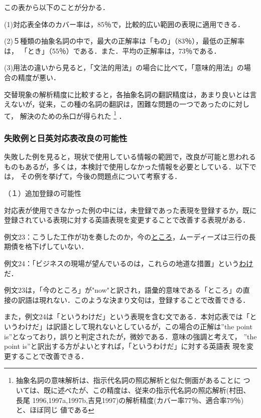 この表から以下のことが分かる．

\vspace{6pt}

(1)対応表全体のカバー率は，85％で，比較的広い範囲の表現に適用できる．

(2)５種類の抽象名詞の中で，最大の正解率は「もの」（83％），最低の正解率は，
「とき」（55％）である．また．平均の正解率は，73％である．

(3)用法の違いから見ると，「文法的用法」の場合に比べて，「意味的用法」の場
合の精度が悪い．

\vspace{6pt}

交替現象の解析精度に比較すると，各抽象名詞の翻訳精度は，あまり良いとは言
えないが，従来，この種の名詞の翻訳は，困難な問題の一つであったのに対して，
解決のための糸口が得られた
\footnote{抽象名詞の意味解析は、指示代名詞の照応解析と似た側面があることに
ついては、既に述べたが、この精度は、従来の指示代名詞の照応解析(村田、長尾
1996,1997a,1997b,吉見1997)の解析精度(カバー率77％、適合率79％)と、ほぼ同じ
値である}
．

\subsubsection{失敗例と日英対応表改良の可能性}

失敗した例を見ると，現状で使用している情報の範囲で，改良が可能と思われる
ものもあるが，多くは，本検討で使用しなかった情報を必要としている．以下では，
その例を挙げて，今後の問題点について考察する．

（１）追加登録の可能性

対応表が使用できなかった例の中には，未登録であった表現を登録するか，既に
登録されている表現に対する英語表現を変更することで改善する表現がある．

\vspace{6pt}

例文23：こうした工作が功を奏したのか，今の\underline{ところ}，ムーディーズは三行の長
期債を格下げしていない．

例文24：「ビジネスの現場が望んでいるのは，これらの地道な措置」という\underline{わけ}
だ．

\vspace{6pt}

例文23は，「今のところ」が"now"と訳され，語彙的意味である「ところ」の直
接の訳語は現れない．このような決まり文句は，登録することで改善できる．

また，例文24は「というわけだ」という表現を含む文である．本対応表では「と
いうわけだ」は訳語として現れないとしているが，この場合の正解は''the
point is''となっており，誤りと判定されたが，微妙である．意味の強調と考えて，
''the point is''と訳出する方がよいとすれば，「というわけだ」に対する英語表
現を変更することで改善できる．

